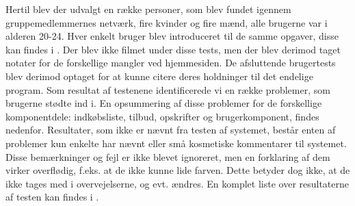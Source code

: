 Hertil blev der udvalgt en række personer, som blev fundet igennem gruppemedlemmernes netværk, fire kvinder og fire mænd, alle brugerne var i alderen 20-24.
Hver enkelt bruger blev introduceret til de samme opgaver, disse kan findes i .
Der blev ikke filmet under disse tests, men der blev derimod taget notater for de forskellige mangler ved hjemmesiden. 
De afsluttende brugertests blev derimod optaget for at kunne citere deres holdninger til det endelige program.
Som resultat af testenene identificerede vi en række problemer, som brugerne stødte ind i.
En opsummering af disse problemer for de forskellige komponentdele: indkøbsliste, tilbud, opskrifter og brugerkomponent, findes nedenfor.
Resultater, som ikke er nævnt fra testen af systemet, består enten af problemer kun enkelte har nævnt eller små kosmetiske kommentarer til systemet.
Disse bemærkninger og fejl er ikke blevet ignoreret, men en forklaring af dem virker overflødig, f.eks. at de ikke kunne lide farven. 
Dette betyder dog ikke, at de ikke tages med i overvejelserne, og evt. ændres.
En komplet liste over resultaterne af testen kan findes i .
